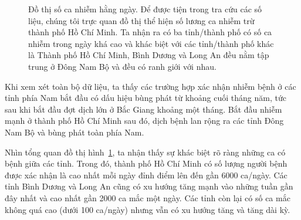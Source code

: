 \documentclass[../thesis.tex]{subfiles}
\begin{document}
\begin{figure}
	\centering
	\caption[Đồ thị số ca nhiễm hằng ngày]{Đồ thị số ca nhiễm hằng ngày. Để được tiện trong tra cứu các số liệu, chúng tôi trực quan đồ thị thể hiện số lương ca nhiễm trừ thành phố Hồ Chí Minh. Ta nhận ra có ba tỉnh/thành phố có số ca nhiễm trong ngày khá cao và khác biệt với các tỉnh/thành phố khác là Thành phố Hồ Chí Minh, Bình Dương và Long An đều nằm tập trung ở Đông Nam Bộ và đều có ranh giới với nhau. \label{fig:case}}
	\end{figure}

Khi xem xét toàn bộ dữ liệu, ta thấy các trường hợp xác nhận nhiễm bệnh ở các tỉnh phía Nam bắt đầu có dấu hiệu bùng phát từ khoảng cuối tháng năm, tức sau khi bắt đầu đợt dịch lớn ở Bắc Giang khoảng một tháng. Bắt đầu nhiễm mạnh ở thành phố Hồ Chí Minh sau đó, dịch bệnh lan rộng ra các tỉnh Đông Nam Bộ và bùng phát toàn phía Nam. 

Nhìn tổng quan đồ thị hình~\ref{fig:case}, ta nhận thấy sự khác biệt rõ ràng những ca có bệnh giữa các tỉnh. Trong đó, thành phố Hồ Chí Minh có số lượng người bệnh được xác nhận là cao nhất mỗi ngày đỉnh điểm lên đến gần 6000 ca/ngày. Các tỉnh Bình Dương và Long An cũng có xu hướng tăng mạnh vào những tuần gần đây nhất và cao nhất gần 2000 ca mắc một ngày. Các tỉnh còn lại có số ca mắc không quá cao (dưới 100 ca/ngày) nhưng vẫn có xu hướng tăng và tăng dài kỳ. 
\end{document}
